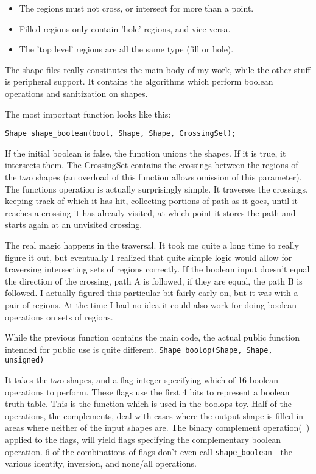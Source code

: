\documentclass[openany]{book}
\begin{document}
\begin{itemize}
\item{ The regions must not cross, or intersect for more than a point.}
\item{ Filled regions only contain 'hole' regions, and vice-versa.}
\item{ The 'top level' regions are all the same type (fill or hole).}
\end{itemize}

The shape files really constitutes the main body of my work, while the other stuff is peripheral support. It contains the algorithms which perform boolean operations and sanitization on shapes.

The most important function looks like this:

\verb|Shape shape_boolean(bool, Shape, Shape, CrossingSet);|

If the initial boolean is false, the function unions the shapes. If it is true, it intersects them. The CrossingSet contains the crossings between the regions of the two shapes (an overload of this function allows omission of this parameter). The functions operation is actually surprisingly simple. It traverses the crossings, keeping track of which it has hit, collecting portions of path as it goes, until it reaches a crossing it has already visited, at which point it stores the path and starts again at an unvisited crossing.

The real magic happens in the traversal. It took me quite a long time to really figure it out, but eventually I realized that quite simple logic would allow for traversing intersecting sets of regions correctly. If the boolean input doesn't equal the direction of the crossing, path A is followed, if they are equal, the path B is followed. I actually figured this particular bit fairly early on, but it was with a pair of regions. At the time I had no idea it could also work for doing boolean operations on sets of regions.

While the previous function contains the main code, the actual public function intended for public use is quite different.
\verb|Shape boolop(Shape, Shape, unsigned)|

It takes the two shapes, and a flag integer specifying which of 16 boolean operations to perform. These flags use the first 4 bits to represent a boolean truth table. This is the function which is used in the boolops toy. Half of the operations, the complements, deal with cases where the output shape is filled in areas where neither of the input shapes are. The binary complement operation(~) applied to the flags, will yield flags specifying the complementary boolean operation. 6 of the combinations of flags don't even call \verb|shape_boolean| - the various identity, inversion, and none/all operations.
\end{document}
